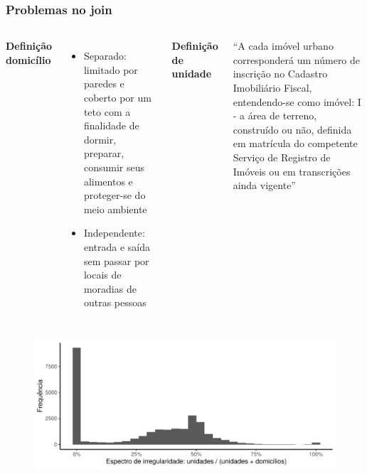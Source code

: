 \documentclass[%
    9pt, 
    aspectratio=169,
]{beamer}
\begin{document}
\begin{frame}
    \frametitle{Problemas no join}
    \begin{columns}[T]
        \textbf{Definição domicílio}
        \smallskip

        \begin{itemize}
            \item Separado: limitado por paredes e coberto por um teto com a finalidade de dormir, preparar, consumir seus alimentos e proteger-se do meio ambiente
            \item Independente: entrada e saída sem passar por locais de moradias de outras pessoas
        \end{itemize}

        \textbf{Definição de unidade}
        \smallskip

        ``A cada imóvel urbano corresponderá um número de inscrição no Cadastro Imobiliário Fiscal, entendendo-se como imóvel: I - a área de terreno, construído ou não, definida em matrícula do competente Serviço de Registro de Imóveis ou em transcrições ainda vigente''
    \end{columns}

    \begin{figure}
        \centering
        \includegraphics[width = .7\textwidth]{imagens/disparidade_censoIPTU.pdf}
    \end{figure}
\end{frame}
\end{document}
